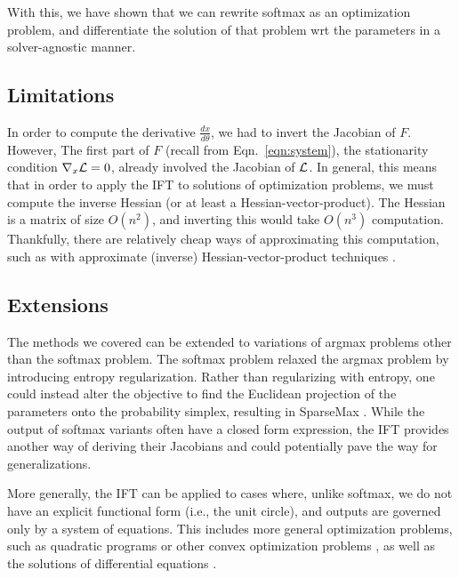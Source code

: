\documentclass[11pt]{article}
\begin{document}
With this, we have shown that we can rewrite softmax as an optimization problem,
and differentiate the solution of that problem wrt the parameters in a solver-agnostic
manner.


\subsection{Limitations}
In order to compute the derivative $\frac{dx}{d\theta}$, we had to invert the Jacobian of $F$.
However, The first part of $F$ (recall from Eqn.~\ref{eqn:system}), the stationarity condition $\nabla_x\mathcal{L} = 0$,
already involved the Jacobian of $\mathcal{L}$.
In general, this means that in order to apply the IFT to solutions of optimization problems,
we must compute the inverse Hessian (or at least a Hessian-vector-product).
The Hessian is a matrix of size $O(n^2)$, and inverting this would take $O(n^3)$ computation.
Thankfully, there are relatively cheap ways of approximating this computation,
such as with approximate (inverse) Hessian-vector-product techniques
\citep{rajeswaran2019imaml,lorraine2019hoift}.

\subsection{Extensions}
The methods we covered can be extended to variations of argmax problems
other than the softmax problem.
The softmax problem relaxed the argmax problem by introducing entropy regularization.
Rather than regularizing with entropy, one could instead alter the objective to find
the Euclidean projection of the parameters onto the probability simplex,
resulting in SparseMax \citep{sparsemax}.
While the output of softmax variants often have a closed form expression,
the IFT provides another way of deriving their Jacobians
and could potentially pave the way for generalizations.

More generally, the IFT can be applied to cases where, unlike softmax,
we do not have an explicit functional form (i.e., the unit circle),
and outputs are governed only by a system of equations.
This includes more general optimization problems, such as quadratic programs \citep{optnet}
or other convex optimization problems \citep{agrawal2019diffcvx},
as well as the solutions of differential equations \citep{neuralode}.
\end{document}
